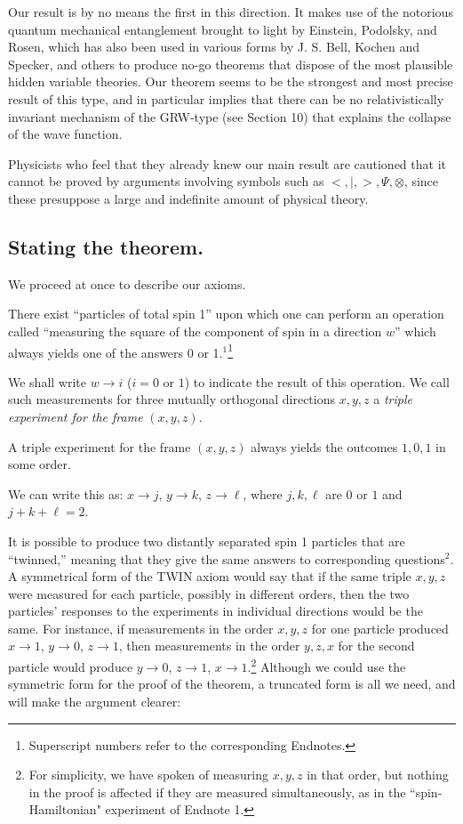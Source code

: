 \documentclass[12pt]{amsart}
\begin{document}
Our result is by no means the first in this direction.  It makes use of
the notorious quantum mechanical entanglement brought to light by
Einstein, Podolsky, and Rosen, which has also been used in various forms
by J. S. Bell, Kochen and Specker, and others to produce no-go theorems
that dispose of the most plausible hidden variable theories. Our theorem seems 
to be the strongest and most precise result of this type, and in particular implies
that there can be no relativistically invariant mechanism of the GRW-type (see Section 10) that explains the collapse of the wave function.  

Physicists who feel that they already knew our main result are cautioned that it cannot be proved by arguments involving symbols such as $<,|,>,\Psi,\otimes$, since these presuppose a large and indefinite amount of physical theory.

\subsection {Stating the theorem.}

We proceed at once to describe our axioms.


There exist ``particles of total spin 1'' upon which one can
perform an operation called ``measuring the square of the
component of spin in a direction  $w$'' which always yields one of the
answers 0 or 1.$^1$\footnote{Superscript numbers refer to the corresponding Endnotes.}

 We shall write $w \to i$ ($i = 0$ or $1$) 
to indicate the result of this operation.
We call such measurements for three mutually orthogonal directions $x,y,z$
a {\it triple experiment for the frame} $(x,y,z)$.

  A triple experiment for the frame $(x,y,z)$ always yields the
outcomes $1, 0, 1$ in some order.


We can write this as:  $x \to j$, $y \to k$, $z \to \ell$,
where $j, k, \ell$ are $0$ or $1$ and $j+k+\ell =2$.

It is possible to produce two distantly separated spin 1 particles
that are ``twinned,'' meaning that they give the same answers to
corresponding ques\-tions$^2$.
A symmetrical form of the TWIN axiom would say that if the same triple
$x,y,z$ were measured for each particle, possibly in different orders,
then the two particles' responses to the experiments in individual
directions would be the same. 
For instance, if measurements in the order $x,y,z$ for one particle
produced
    $x \to 1$, $y \to 0$, $z \to 1$,
then measurements in the order $y,z,x$ for the second particle would
produce
    $y \to 0$, $z \to 1$, $x \to 1$.\footnote{For simplicity, we have 
spoken of measuring $x,y,z$ in that order, but 
nothing in the proof is affected if they are measured simultaneously, as in the
``spin-Hamiltonian" experiment of Endnote 1.}
Although we could use the symmetric form for the proof of the theorem, a
truncated form is all we need, and will make the argument clearer:
\end{document}
